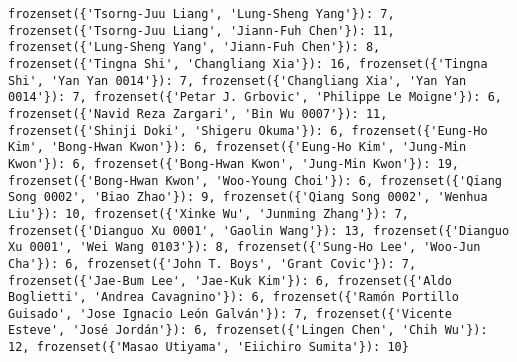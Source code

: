 \documentclass[11pt]{article}
\begin{document}
\begin{verbatim}
frozenset({'Tsorng-Juu Liang', 'Lung-Sheng Yang'}): 7, frozenset({'Tsorng-Juu Liang', 'Jiann-Fuh Chen'}): 11, frozenset({'Lung-Sheng Yang', 'Jiann-Fuh Chen'}): 8, frozenset({'Tingna Shi', 'Changliang Xia'}): 16, frozenset({'Tingna Shi', 'Yan Yan 0014'}): 7, frozenset({'Changliang Xia', 'Yan Yan 0014'}): 7, frozenset({'Petar J. Grbovic', 'Philippe Le Moigne'}): 6, frozenset({'Navid Reza Zargari', 'Bin Wu 0007'}): 11, frozenset({'Shinji Doki', 'Shigeru Okuma'}): 6, frozenset({'Eung-Ho Kim', 'Bong-Hwan Kwon'}): 6, frozenset({'Eung-Ho Kim', 'Jung-Min Kwon'}): 6, frozenset({'Bong-Hwan Kwon', 'Jung-Min Kwon'}): 19, frozenset({'Bong-Hwan Kwon', 'Woo-Young Choi'}): 6, frozenset({'Qiang Song 0002', 'Biao Zhao'}): 9, frozenset({'Qiang Song 0002', 'Wenhua Liu'}): 10, frozenset({'Xinke Wu', 'Junming Zhang'}): 7, frozenset({'Dianguo Xu 0001', 'Gaolin Wang'}): 13, frozenset({'Dianguo Xu 0001', 'Wei Wang 0103'}): 8, frozenset({'Sung-Ho Lee', 'Woo-Jun Cha'}): 6, frozenset({'John T. Boys', 'Grant Covic'}): 7, frozenset({'Jae-Bum Lee', 'Jae-Kuk Kim'}): 6, frozenset({'Aldo Boglietti', 'Andrea Cavagnino'}): 6, frozenset({'Ramón Portillo Guisado', 'Jose Ignacio León Galván'}): 7, frozenset({'Vicente Esteve', 'José Jordán'}): 6, frozenset({'Lingen Chen', 'Chih Wu'}): 12, frozenset({'Masao Utiyama', 'Eiichiro Sumita'}): 10}



\end{verbatim}
\end{document}
